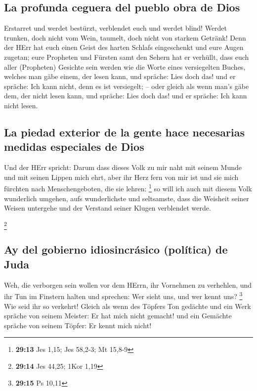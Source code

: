 \hypertarget{la-profunda-ceguera-del-pueblo-obra-de-dios}{%
\subsection{La profunda ceguera del pueblo obra de
Dios}\label{la-profunda-ceguera-del-pueblo-obra-de-dios}}

 Erstarret und werdet bestürzt, verblendet euch und werdet
blind! Werdet trunken, doch nicht vom Wein, taumelt, doch nicht von
starkem Getränk!  Denn der HErr hat euch einen Geist des
harten Schlafs eingeschenkt und eure Augen zugetan; eure Propheten und
Fürsten samt den Sehern hat er verhüllt,  dass euch aller
(Propheten) Gesichte sein werden wie die Worte eines versiegelten
Buches, welches man gäbe einem, der lesen kann, und spräche: Lies doch
das! und er spräche: Ich kann nicht, denn es ist versiegelt; --
 oder gleich als wenn man's gäbe dem, der nicht lesen
kann, und spräche: Lies doch das! und er spräche: Ich kann nicht lesen.

\hypertarget{la-piedad-exterior-de-la-gente-hace-necesarias-medidas-especiales-de-dios}{%
\subsection{La piedad exterior de la gente hace necesarias medidas
especiales de
Dios}\label{la-piedad-exterior-de-la-gente-hace-necesarias-medidas-especiales-de-dios}}

 Und der HErr spricht: Darum dass dieses Volk zu mir naht
mit seinem Munde und mit seinen Lippen mich ehrt, aber ihr Herz fern von
mir ist und sie mich fürchten nach Menschengeboten, die sie lehren:
\footnote{\textbf{29:13} Jes 1,15; Jes 58,2-3; Mt 15,8-9}
 so will ich auch mit diesem Volk wunderlich umgehen,
aufs wunderlichste und seltsamste, dass die Weisheit seiner Weisen
untergehe und der Verstand seiner Klugen verblendet werde.

\footnote{\textbf{29:14} Jes 44,25; 1Kor 1,19}

\hypertarget{ay-del-gobierno-idiosincruxe1sico-poluxedtica-de-juda}{%
\subsection{Ay del gobierno idiosincrásico (política) de
Juda}\label{ay-del-gobierno-idiosincruxe1sico-poluxedtica-de-juda}}

 Weh, die verborgen sein wollen vor dem HErrn, ihr
Vornehmen zu verhehlen, und ihr Tun im Finstern halten und sprechen: Wer
sieht uns, und wer kennt uns? \footnote{\textbf{29:15} Ps 10,11}
 Wie seid ihr so verkehrt! Gleich als wenn des Töpfers
Ton gedächte und ein Werk spräche von seinem Meister: Er hat mich nicht
gemacht! und ein Gemächte spräche von seinem Töpfer: Er kennt mich
nicht!

